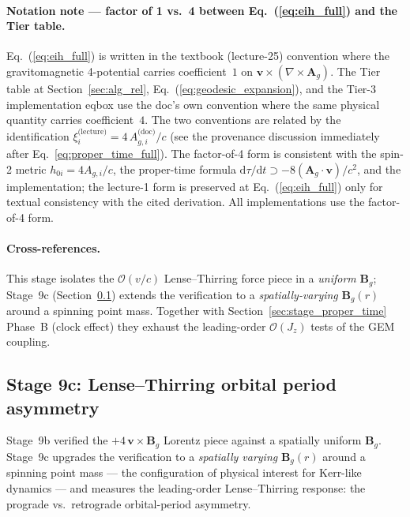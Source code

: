 \documentclass[11pt,a4paper]{article}
\newcommand{\vv}[1]{\mathbf{#1}}
\newcommand{\Ag}{\vv{A}_g}
\newcommand{\order}[1]{\mathcal{O}(#1)}
\newcommand{\dd}{\mathrm{d}}
\begin{document}
\paragraph{Notation note --- factor of 1 vs.\ 4 between
Eq.~(\ref{eq:eih_full}) and the Tier table.}
Eq.~(\ref{eq:eih_full}) is written in the textbook (lecture-25)
convention where the gravitomagnetic 4-potential carries coefficient~$1$
on $\vv{v}\!\times\!(\nabla\!\times\!\Ag)$.  The Tier table at
Section~\ref{sec:alg_rel}, Eq.~(\ref{eq:geodesic_expansion}), and the
Tier-3 implementation eqbox use the doc's own convention where the
same physical quantity carries coefficient~$4$.  The two conventions
are related by the identification
$\xi_i^{\text{(lecture)}} = 4\,A_{g,i}^{\text{(doc)}}/c$ (see the
provenance discussion immediately after Eq.~\ref{eq:proper_time_full}).
The factor-of-4 form is consistent with the spin-2 metric
$h_{0i} = 4A_{g,i}/c$, the proper-time formula
$\dd\tau/\dd t \supset -8(\Ag\!\cdot\!\vv{v})/c^2$, and the
implementation; the lecture-1 form is preserved at
Eq.~(\ref{eq:eih_full}) only for textual consistency with the cited
derivation.  All implementations use the factor-of-4 form.

\paragraph{Cross-references.}  This stage isolates the
$\order{v/c}$ Lense--Thirring force piece in a \emph{uniform} $\vv{B}_g$;
Stage~9c (Section~\ref{sec:stage_lt_period}) extends the verification
to a \emph{spatially-varying} $\vv{B}_g(r)$ around a spinning point mass.
Together with Section~\ref{sec:stage_proper_time} Phase~B (clock effect)
they exhaust the leading-order $\order{J_z}$ tests of the GEM coupling.

\subsection{Stage 9c: Lense--Thirring orbital period asymmetry}
\label{sec:stage_lt_period}

Stage~9b verified the $+4\,\vv{v}\!\times\!\vv{B}_g$ Lorentz piece against
a spatially uniform $\vv{B}_g$.  Stage~9c upgrades the verification to a
\emph{spatially varying} $\vv{B}_g(r)$ around a spinning point mass --- the
configuration of physical interest for Kerr-like dynamics --- and measures
the leading-order Lense--Thirring response: the prograde vs.\ retrograde
orbital-period asymmetry.
\end{document}
